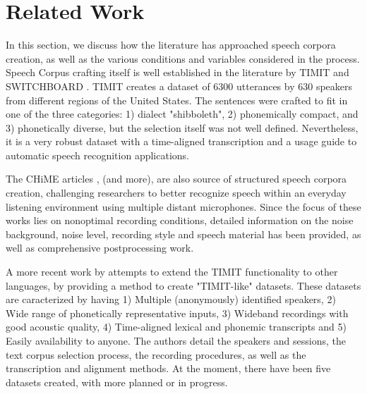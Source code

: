 \chapter[Related Work]{Related Work}
\label{chap:related-work}

In this section, we discuss how the literature has approached speech corpora creation, as well as the various conditions and variables considered in the process. Speech Corpus crafting itself is well established in the literature by TIMIT \cite{Lamel1992timmit} and SWITCHBOARD \cite{godfrey1992switchboard}. TIMIT creates a dataset of 6300 utterances by 630 speakers from different regions of the United States. The sentences were crafted to fit in one of the three categories: 1) dialect "shibboleth", 2) phonemically compact, and 3) phonetically diverse, but the selection itself was not well defined. Nevertheless, it is a very robust dataset with a time-aligned transcription and a usage guide to automatic speech recognition applications.

The CHiME articles \cite{christensen2010chime} \cite{barker2013pascal}, \cite{barker2018fifth} (and more), are also source of structured speech corpora creation, challenging researchers to better recognize speech within an everyday listening environment using multiple distant microphones. Since the focus of these works lies on nonoptimal recording conditions, detailed information on the noise background, noise level, recording style and speech material has been provided, as well as comprehensive postprocessing work.

A more recent work by \cite{chanchaochai2018globaltimit} attempts to extend the TIMIT functionality to other languages, by providing a method to create "TIMIT-like" datasets. These datasets are caracterized by having 1) Multiple (anonymously) identified speakers, 2) Wide range of phonetically representative inputs, 3) Wideband recordings with good acoustic quality, 4) Time-aligned lexical and phonemic transcripts and 5) Easily availability to anyone. The authors detail the speakers and sessions, the text corpus selection process, the recording procedures, as well as the transcription and alignment methods. At the moment, there have been five datasets created, with more planned or in progress.

